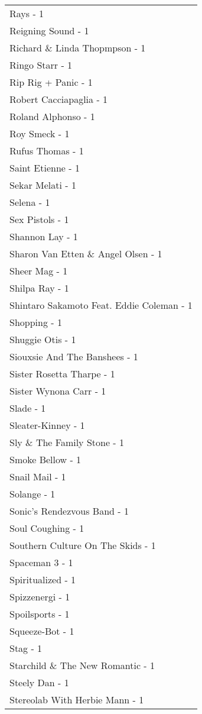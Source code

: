\documentclass[
]{article}
\begin{document}
\begin{longtable}{l}
Rays - 1 \\ 
Reigning Sound - 1 \\ 
Richard \& Linda Thopmpson - 1 \\ 
Ringo Starr - 1 \\ 
Rip Rig + Panic - 1 \\ 
Robert Cacciapaglia - 1 \\ 
Roland Alphonso - 1 \\ 
Roy Smeck - 1 \\ 
Rufus Thomas - 1 \\ 
Saint Etienne - 1 \\ 
Sekar Melati - 1 \\ 
Selena - 1 \\ 
Sex Pistols - 1 \\ 
Shannon Lay - 1 \\ 
Sharon Van Etten \& Angel Olsen - 1 \\ 
Sheer Mag - 1 \\ 
Shilpa Ray - 1 \\ 
Shintaro Sakamoto Feat. Eddie Coleman - 1 \\ 
Shopping - 1 \\ 
Shuggie Otis - 1 \\ 
Siouxsie And The Banshees - 1 \\ 
Sister Rosetta Tharpe - 1 \\ 
Sister Wynona Carr - 1 \\ 
Slade - 1 \\ 
Sleater-Kinney - 1 \\ 
Sly \& The Family Stone - 1 \\ 
Smoke Bellow - 1 \\ 
Snail Mail - 1 \\ 
Solange - 1 \\ 
Sonic's Rendezvous Band - 1 \\ 
Soul Coughing - 1 \\ 
Southern Culture On The Skids - 1 \\ 
Spaceman 3 - 1 \\ 
Spiritualized - 1 \\ 
Spizzenergi - 1 \\ 
Spoilsports - 1 \\ 
Squeeze-Bot - 1 \\ 
Stag - 1 \\ 
Starchild \& The New Romantic - 1 \\ 
Steely Dan - 1 \\ 
Stereolab With Herbie Mann - 1 \\ 

\end{longtable}
\end{document}
